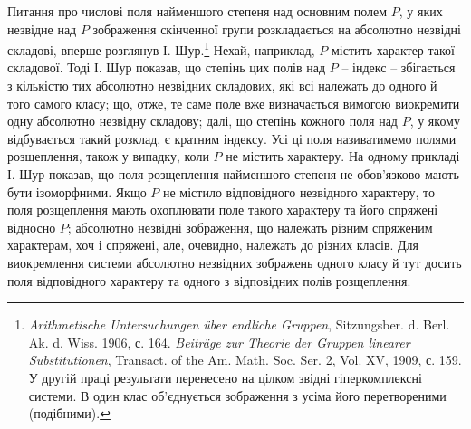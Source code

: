 \documentclass[11pt]{article}
\begin{document}
\setcounter{footnote}{0}

\noindent Питання про числові поля найменшого степеня над основним полем $P$, у яких незвідне над $P$ зображення скінченної групи розкладається на абсолютно незвідні складові, вперше розглянув І. Шур.\footnote{\emph{Arithmetische Untersuchungen über endliche Gruppen}, Sitzungsber. d. Berl. Ak. d. Wiss. 1906, с. 164. \emph{Beiträge zur Theorie der Gruppen linearer Substitutionen}, Transact. of the Am. Math. Soc. Ser. 2, Vol. XV, 1909, с. 159. У другій праці результати перенесено на цілком звідні гіперкомплексні системи. В один клас об'єднується зображення з усіма його перетвореними (подібними).} Нехай, наприклад, $P$ містить характер такої складової. Тоді І. Шур показав, що степінь цих полів над $P$ -- індекс -- збігається з кількістю тих абсолютно незвідних складових, які всі належать до одного й того самого класу; що, отже, те саме поле вже визначається вимогою виокремити одну абсолютно незвідну складову; далі, що степінь кожного поля над $P$, у якому відбувається такий розклад, є кратним індексу. Усі ці поля називатимемо полями розщеплення, також у випадку, коли $P$ не містить характеру. На одному прикладі І. Шур показав, що поля розщеплення найменшого степеня не обов'язково мають бути ізоморфними. Якщо $P$ не містило відповідного незвідного характеру, то поля розщеплення мають охоплювати поле такого характеру та його спряжені відносно $P$; абсолютно незвідні зображення, що належать різним спряженим характерам, хоч і спряжені, але, очевидно, належать до різних класів. Для виокремлення системи абсолютно незвідних зображень одного класу й тут досить поля відповідного характеру та одного з відповідних полів розщеплення.
\end{document}
